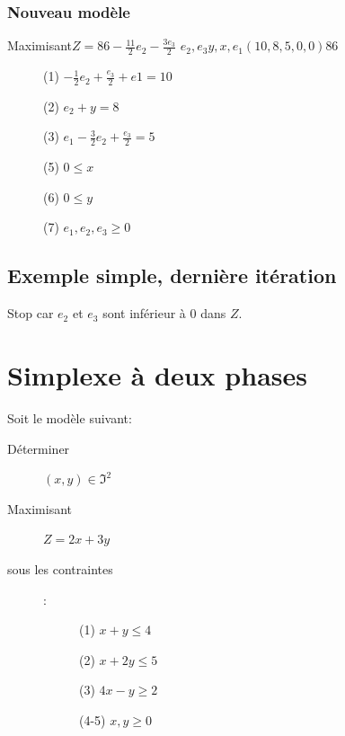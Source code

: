 \subsection{Nouveau modèle}
        {Maximisant}{$Z = 86 - \frac{11}{2}e_2 - \frac{3e_3}{2}$}
        {$e_2,e_3$}{$y,x,e_1$}{$(10,8,5,0,0)$}{$86$}
        {\begin{description}
\item[] (1) $- \frac{1}{2}e_2 + \frac{e_3}{2} + e1 = 10$
\item[] (2) $e_2 + y = 8$
\item[] (3) $e_1 - \frac{3}{2}e_2 + \frac{e_3}{2} = 5$
\item[] (5) $ 0 \leq x$
\item[] (6) $ 0 \leq y$
\item[] (7) $ e_1,e_2,e_3 \geq 0$
\end{description}
}
\section{Exemple simple, dernière itération}
Stop car $e_2$ et $e_3$ sont inférieur à 0 dans $Z$.

\chapter{Simplexe à deux phases}\pagebreak
Soit le modèle suivant:
\begin{description}
\item[Déterminer] $(x,y) \in \Im^2$
\item[Maximisant] $Z = 2x + 3y$
\item[sous les contraintes]:
\begin{description}
\item[] (1) $x + y \leqslant 4$
\item[] (2) $x + 2y \leqslant 5$
\item[] (3) $4x -y \geqslant 2$
\item[] (4-5) $x,y \geqslant 0$
\end{description}
\end{description}

